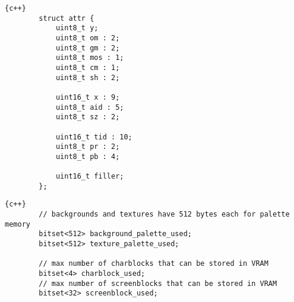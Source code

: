 \begin{itemize}
        \vspace{\onelineskip}
        \begin{lstlisting}[caption={\textit{Struct} com \textit{bitfields} para atributos das texturas.}]
        {c++}
        struct attr {
            uint8_t y;
            uint8_t om : 2;
            uint8_t gm : 2;
            uint8_t mos : 1;
            uint8_t cm : 1;
            uint8_t sh : 2;

            uint16_t x : 9;
            uint8_t aid : 5;
            uint8_t sz : 2;

            uint16_t tid : 10;
            uint8_t pr : 2;
            uint8_t pb : 4;

            uint16_t filler;
        };
        \end{lstlisting}
        \vspace{\onelineskip}

        \vspace{\onelineskip}
        \begin{lstlisting}[caption={\textit{Bitsets} para checagem de disponibilidade na memória.}]
        {c++}
        // backgrounds and textures have 512 bytes each for palette memory
        bitset<512> background_palette_used;
        bitset<512> texture_palette_used;

        // max number of charblocks that can be stored in VRAM
        bitset<4> charblock_used;
        // max number of screenblocks that can be stored in VRAM
        bitset<32> screenblock_used;
        \end{lstlisting}
        \vspace{\onelineskip}

    \end{itemize}